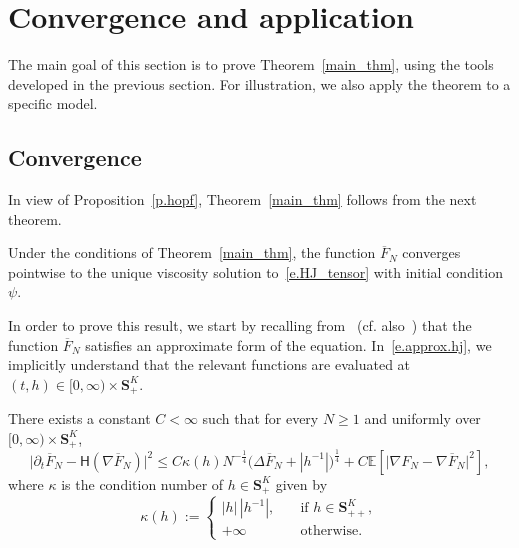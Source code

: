 \documentclass[AHL,Unicode,longabstracts,published]{cedram}
\newcommand{\E}{\mathbb{E}}
\renewcommand{\S}{\mathbf{S}}
\renewcommand{\H}{\mathsf{H}}
\renewcommand{\ge}{\geqslant}
\renewcommand{\leq}{\leqslant}
\renewcommand{\bar}{\overline}
\newcommand{\Ll}{\left}
\newcommand{\Rr}{\right}
\begin{document}
\section{Convergence and application}\label{s.proof}


The main goal of this section is to prove Theorem~\ref{main_thm}, using the tools developed in the previous section. For illustration, we also apply the theorem to a specific model.



\subsection{Convergence}

In view of Proposition~\ref{p.hopf}, Theorem~\ref{main_thm} follows from the next theorem.

\begin{theo}\label{t.cvg}
Under the conditions of Theorem~\ref{main_thm}, the function $\bar F_N$ converges pointwise to the unique viscosity solution to~\eqref{e.HJ_tensor} with initial condition $\psi$.
\end{theo}

In order to prove this result, we start by recalling from~\cite[Proposition~3.1]{HBJ} (cf. also~\cite[Proposition~1.2]{mourrat2019hamilton}) that the function $\bar F_N$ satisfies an approximate form of the equation. In~\eqref{e.approx.hj}, we implicitly understand that the relevant functions are evaluated at $(t,h) \in [0,\infty) \times \S^K_+$.
\begin{prop}\label{p.approx.hj}
There exists a constant $C < \infty$ such that for every $N \ge 1$ and uniformly over $[0,\infty) \times \S^K_+$,
\begin{equation}\label{e.approx.hj}
\big|\partial_t\bar F_N-\H\Ll(\nabla\bar F_N\Rr)\big|^2\leq C\kappa(h)N^{-\frac{1}{4}}\big(\Delta \bar F_N+\Ll|h^{-1}\Rr|\big)^{\frac{1}{4}}+C\E\Ll[\big|\nabla F_N-\nabla \bar F_N\big|^2\Rr],
\end{equation}
where $\kappa$ is the condition number of $h\in \S^K_+$ given by
\begin{equation*}
\kappa(h) :=
\begin{cases}
|h|\,\Ll|h^{-1}\Rr|, &\quad\text{if }h\in \S^K_{++}, \\
+\infty &\quad\text{otherwise}.
\end{cases}
\end{equation*}
\end{prop}
\end{document}
